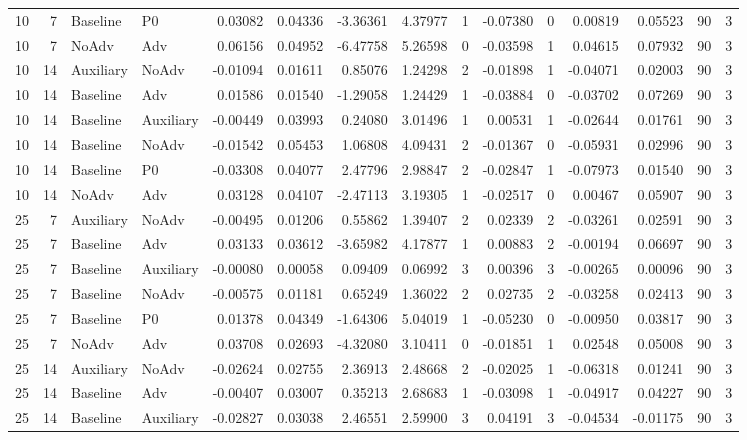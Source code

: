 \begin{longtable}{rrllrrrrrrrrrrr}
10 & 7 & Baseline & P0 & 0.03082 & 0.04336 & -3.36361 & 4.37977 & 1 & -0.07380 & 0 & 0.00819 & 0.05523 & 90 & 3 \\
10 & 7 & NoAdv & Adv & 0.06156 & 0.04952 & -6.47758 & 5.26598 & 0 & -0.03598 & 1 & 0.04615 & 0.07932 & 90 & 3 \\
10 & 14 & Auxiliary & NoAdv & -0.01094 & 0.01611 & 0.85076 & 1.24298 & 2 & -0.01898 & 1 & -0.04071 & 0.02003 & 90 & 3 \\
10 & 14 & Baseline & Adv & 0.01586 & 0.01540 & -1.29058 & 1.24429 & 1 & -0.03884 & 0 & -0.03702 & 0.07269 & 90 & 3 \\
10 & 14 & Baseline & Auxiliary & -0.00449 & 0.03993 & 0.24080 & 3.01496 & 1 & 0.00531 & 1 & -0.02644 & 0.01761 & 90 & 3 \\
10 & 14 & Baseline & NoAdv & -0.01542 & 0.05453 & 1.06808 & 4.09431 & 2 & -0.01367 & 0 & -0.05931 & 0.02996 & 90 & 3 \\
10 & 14 & Baseline & P0 & -0.03308 & 0.04077 & 2.47796 & 2.98847 & 2 & -0.02847 & 1 & -0.07973 & 0.01540 & 90 & 3 \\
10 & 14 & NoAdv & Adv & 0.03128 & 0.04107 & -2.47113 & 3.19305 & 1 & -0.02517 & 0 & 0.00467 & 0.05907 & 90 & 3 \\
25 & 7 & Auxiliary & NoAdv & -0.00495 & 0.01206 & 0.55862 & 1.39407 & 2 & 0.02339 & 2 & -0.03261 & 0.02591 & 90 & 3 \\
25 & 7 & Baseline & Adv & 0.03133 & 0.03612 & -3.65982 & 4.17877 & 1 & 0.00883 & 2 & -0.00194 & 0.06697 & 90 & 3 \\
25 & 7 & Baseline & Auxiliary & -0.00080 & 0.00058 & 0.09409 & 0.06992 & 3 & 0.00396 & 3 & -0.00265 & 0.00096 & 90 & 3 \\
25 & 7 & Baseline & NoAdv & -0.00575 & 0.01181 & 0.65249 & 1.36022 & 2 & 0.02735 & 2 & -0.03258 & 0.02413 & 90 & 3 \\
25 & 7 & Baseline & P0 & 0.01378 & 0.04349 & -1.64306 & 5.04019 & 1 & -0.05230 & 0 & -0.00950 & 0.03817 & 90 & 3 \\
25 & 7 & NoAdv & Adv & 0.03708 & 0.02693 & -4.32080 & 3.10411 & 0 & -0.01851 & 1 & 0.02548 & 0.05008 & 90 & 3 \\
25 & 14 & Auxiliary & NoAdv & -0.02624 & 0.02755 & 2.36913 & 2.48668 & 2 & -0.02025 & 1 & -0.06318 & 0.01241 & 90 & 3 \\
25 & 14 & Baseline & Adv & -0.00407 & 0.03007 & 0.35213 & 2.68683 & 1 & -0.03098 & 1 & -0.04917 & 0.04227 & 90 & 3 \\
25 & 14 & Baseline & Auxiliary & -0.02827 & 0.03038 & 2.46551 & 2.59900 & 3 & 0.04191 & 3 & -0.04534 & -0.01175 & 90 & 3 \\

\end{longtable}
